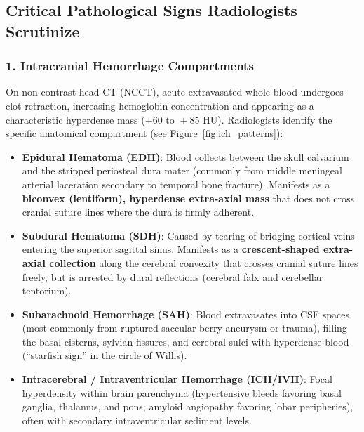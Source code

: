 \documentclass[11pt,a4paper]{article}
\begin{document}
\subsection{Critical Pathological Signs Radiologists Scrutinize}

\subsubsection{1. Intracranial Hemorrhage Compartments}
On non-contrast head CT (NCCT), acute extravasated whole blood undergoes clot retraction, increasing hemoglobin concentration and appearing as a characteristic hyperdense mass ($+60\text{ to }+85\text{ HU}$). Radiologists identify the specific anatomical compartment (see Figure~\ref{fig:ich_patterns}):
\begin{itemize}
    \item \textbf{Epidural Hematoma (EDH)}: Blood collects between the skull calvarium and the stripped periosteal dura mater (commonly from middle meningeal arterial laceration secondary to temporal bone fracture). Manifests as a \textbf{biconvex (lentiform), hyperdense extra-axial mass} that does not cross cranial suture lines where the dura is firmly adherent.
    \item \textbf{Subdural Hematoma (SDH)}: Caused by tearing of bridging cortical veins entering the superior sagittal sinus. Manifests as a \textbf{crescent-shaped extra-axial collection} along the cerebral convexity that crosses cranial suture lines freely, but is arrested by dural reflections (cerebral falx and cerebellar tentorium).
    \item \textbf{Subarachnoid Hemorrhage (SAH)}: Blood extravasates into CSF spaces (most commonly from ruptured saccular berry aneurysm or trauma), filling the basal cisterns, sylvian fissures, and cerebral sulci with hyperdense blood (``starfish sign'' in the circle of Willis).
    \item \textbf{Intracerebral / Intraventricular Hemorrhage (ICH/IVH)}: Focal hyperdensity within brain parenchyma (hypertensive bleeds favoring basal ganglia, thalamus, and pons; amyloid angiopathy favoring lobar peripheries), often with secondary intraventricular sediment levels.
\end{itemize}
\end{document}
